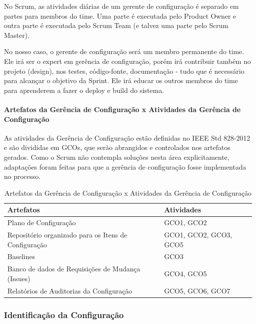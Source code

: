 No Scrum, as atividades diárias de um gerente de configuração é separado em partes para membros do time. Uma parte é executada pelo Product Owner e outra parte é executada pelo Scrum Team (e talvez uma parte pelo Scrum Master).

No nosso caso, o gerente de configuração será um membro permanente do time. Ele irá ser o expert em gerência de configuração, porém irá contribuir também no projeto (design), nos testes, código-fonte, documentação - tudo que é necessário para alcançar o objetivo da Sprint. Ele irá educar os outros membros do time para aprenderem a fazer o deploy e build do sistema.

\paragraph{Artefatos da Gerência de Configuração x Atividades da Gerência de Configuração} 

As atividades da Gerência de Configuração estão definidas no IEEE Std 828-2012 \cite{6170935} e são divididas em GCOs, que serão abrangidos e controlados nos artefatos gerados. Como o Scrum não contempla soluções nesta área explicitamente, adaptações foram feitas para que a gerência de configuração fosse implementada no processo.

\begin{table}[H]
      \begin{center}
        \begin{tabular}{| l | l |}
        \hline
        \textbf{Artefatos} & \textbf{Atividades} \\ \hline
        Plano de Configuração & GCO1, GCO2 \\ \hline
        Repositório organizado para os Itens de Configuração & GCO1, GCO2, GCO3, GCO5 \\ \hline
        Baselines & GCO3 \\ \hline
        Banco de dados de Requisições de Mudança (Issues) & GCO4, GCO5 \\ \hline
        Relatórios de Auditorias da Configuração & GCO5, GCO6, GCO7 \\ \hline
        \end{tabular}
      \end{center}
    \caption{Artefatos da Gerência de Configuração x Atividades da Gerência de Configuração}
    \end{table}
 
  

 \subsubsection{Identificação da Configuração}

